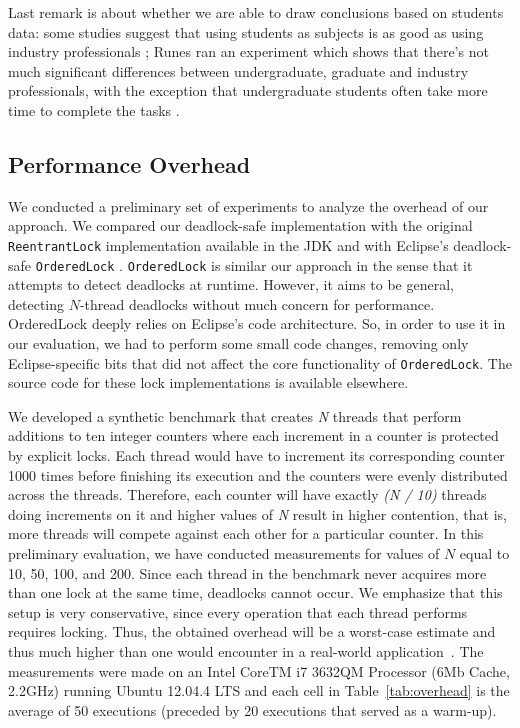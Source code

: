 Last remark is about whether we are able to draw conclusions based on students data: some studies suggest that using students as subjects is as good as using industry professionals \cite{staron}; Runes ran an experiment which shows that there's not much significant differences between undergraduate, graduate and industry professionals, with the exception that undergraduate students often take more time to complete the tasks \cite{runes}.

\subsection{Performance Overhead}\label{sec:perf}

We conducted a preliminary set of experiments to analyze the overhead of our approach. We compared our deadlock-safe implementation with the original {\tt ReentrantLock} implementation available in the JDK and with Eclipse's deadlock-safe {\tt OrderedLock} \cite{orderedlock}. {\tt OrderedLock} is similar our approach in the sense that it attempts to detect deadlocks at runtime. However, it aims to be general, detecting $N$-thread deadlocks without much concern for performance. 
OrderedLock deeply relies on Eclipse's code architecture. So, in order to use it in our evaluation, we had to perform some small code changes, removing only Eclipse-specific bits that did not affect the core functionality of {\tt OrderedLock}. The source code for these lock implementations is available elsewhere\cite{repo}.

We developed a synthetic benchmark that creates \emph{N} threads that perform additions to ten integer counters where each increment in a counter is protected by explicit locks. Each thread would have to increment its corresponding counter 1000 times before finishing its execution and the counters were evenly distributed across the threads. Therefore, each counter will have exactly \emph{(N / 10)} threads doing increments on it and higher values of \emph{N} result in higher contention, that is, more threads will compete against each other for a particular counter. In this preliminary evaluation, we have conducted measurements for values of $N$ equal to 10, 50, 100, and 200. Since each thread in the benchmark never acquires more than one lock at the same time, deadlocks cannot occur. We emphasize that this setup is very conservative, since every operation that each thread performs requires locking. Thus, the obtained overhead will be a worst-case estimate and thus much higher than one would encounter in a real-world application~\cite{lozi}. The measurements were made on an Intel CoreTM i7 3632QM Processor (6Mb Cache, 2.2GHz) running Ubuntu 12.04.4 LTS and each cell in Table~\ref{tab:overhead} is the average of 50 executions (preceded by 20 executions that served as a warm-up). 

